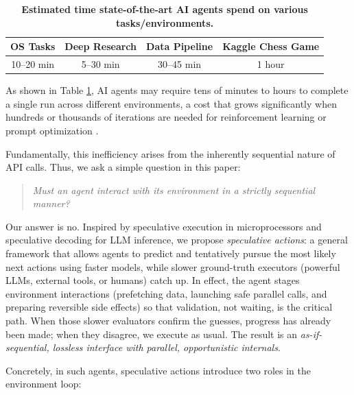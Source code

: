 \documentclass{article} %
\theoremstyle{plain} %
\theoremstyle{definition} %
\theoremstyle{remark} %
\begin{document}
\begin{table}[h]
\centering
\setlength{\tabcolsep}{8pt}
\renewcommand{\arraystretch}{1.3}
\begin{tabular}{*{4}{c}} %
\toprule
\makecell{\textbf{OS Tasks}\\ \citep{abhyankar2025osworld}} &
\makecell{\textbf{Deep Research}\\ \citep{openai2025deepresearch}} &
\makecell{\textbf{Data Pipeline}\\ \citep{jin2025elt}} &
\makecell{\textbf{Kaggle Chess Game}\\ \citep{KaggleGameArena}} \\
\midrule
10–20 min & 5–30 min & 30–45 min & 1 hour \\
\bottomrule
\end{tabular}
\caption{\centering \textbf{Estimated time state-of-the-art AI agents spend on various tasks/environments.}}
\label{tab:Agent-Wall-Time}
\end{table}
As shown in Table \ref{tab:Agent-Wall-Time}, AI agents may require tens of minutes to hours to complete a single run across different environments, a cost that grows significantly when hundreds or thousands of iterations are needed for reinforcement learning or prompt optimization \citep{agrawal2025gepa}.


Fundamentally, this inefficiency arises from the inherently sequential nature of API calls.
Thus, we ask a simple question in this paper:
\vspace{-7pt}
\begin{quote}
\emph{Must an agent interact with its environment in a strictly sequential manner?}
\end{quote}
Our answer is no.
Inspired by speculative execution in microprocessors and speculative decoding for LLM inference, we propose \emph{speculative actions}: a general framework that allows agents to predict and tentatively pursue the most likely next actions using faster models, while slower ground-truth executors (powerful LLMs, external tools, or humans) catch up.
In effect, the agent stages environment interactions (prefetching data, launching safe parallel calls, and preparing reversible side effects) so that validation, not waiting, is the critical path.
When those slower evaluators confirm the guesses, progress has already been made; when they disagree, we execute as usual.
The result is an \emph{as-if-sequential, lossless interface with parallel, opportunistic internals}.

Concretely, in such agents, speculative actions introduce two roles in the environment loop:
\end{document}
